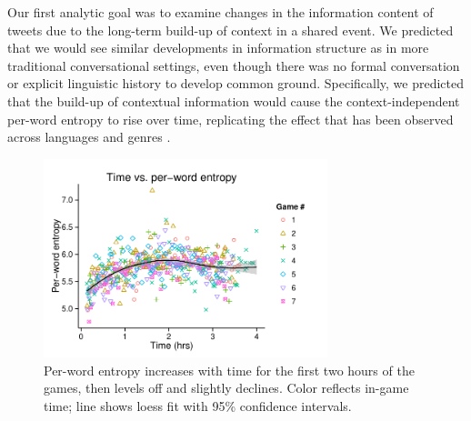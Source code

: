 \documentclass[11pt,letterpaper]{article}
\begin{document}
Our first analytic goal was to examine changes in the information content of tweets due to the long-term build-up of context in a shared event.  We predicted that we would see similar developments in information structure as in more traditional conversational settings, even though there was no formal conversation or explicit linguistic history to develop common ground.  Specifically, we predicted that the build-up of contextual information would cause the context-independent per-word entropy to rise over time, replicating the effect that has been observed across languages and genres \cite{genzel2002,genzel2003,qian2012}.

\begin{figure}
 \centering
  \includegraphics[width=3.25in]{figures/fig1.pdf}
 \caption{Per-word entropy increases with time for the first two hours of the games, then levels off and slightly declines. Color reflects in-game time; line shows loess fit with 95\% confidence intervals.}\label{fig:time-perword-ent}\vspace*{-.5em}
\end{figure}
\end{document}
